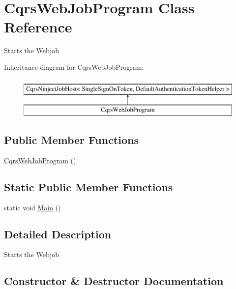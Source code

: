 \hypertarget{classCqrsWebJobProgram}{}\section{Cqrs\+Web\+Job\+Program Class Reference}
\label{classCqrsWebJobProgram}


Starts the Webjob  


Inheritance diagram for Cqrs\+Web\+Job\+Program\+:\begin{figure}[H]
\begin{center}
\leavevmode
\includegraphics[height=2.000000cm]{classCqrsWebJobProgram}
\end{center}
\end{figure}
\subsection*{Public Member Functions}
\begin{DoxyCompactItemize}
\item 
\hyperlink{classCqrsWebJobProgram_aef553539b5ec25d0cdb061fd9895c851_aef553539b5ec25d0cdb061fd9895c851}{Cqrs\+Web\+Job\+Program} ()
\end{DoxyCompactItemize}
\subsection*{Static Public Member Functions}
\begin{DoxyCompactItemize}
\item 
static void \hyperlink{classCqrsWebJobProgram_ab11d66be0194de537cb7ae73e74c2181_ab11d66be0194de537cb7ae73e74c2181}{Main} ()
\end{DoxyCompactItemize}


\subsection{Detailed Description}
Starts the Webjob 



\subsection{Constructor \& Destructor Documentation}
\mbox{\label{classCqrsWebJobProgram_aef553539b5ec25d0cdb061fd9895c851_aef553539b5ec25d0cdb061fd9895c851}} 
